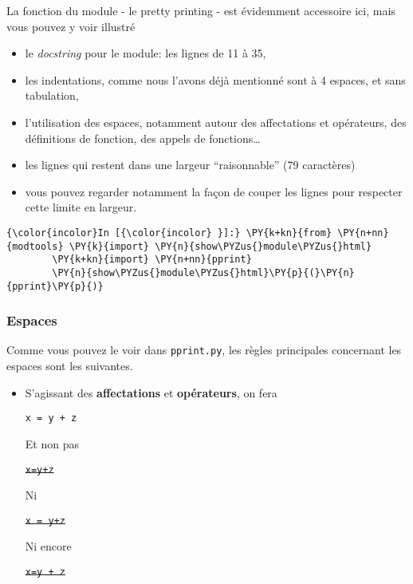 La fonction du module - le pretty printing - est évidemment accessoire
ici, mais vous pouvez y voir illustré

\begin{itemize}
	\item 
	le \emph{docstring} pour le module: les lignes de 11 à 35,
	\item
	les indentations, comme nous l'avons déjà mentionné sont à 4 espaces, et sans tabulation,
	\item
	l'utilisation des espaces, notamment autour des affectations et opérateurs, des
	définitions de fonction, des appels de fonctions\ldots{}
	\item
	les lignes qui restent dans une largeur ``raisonnable'' (79 caractères)
	\item 
	vous pouvez regarder notamment la façon de couper les lignes pour respecter cette limite en largeur.
\end{itemize}


    \begin{Verbatim}[commandchars=\\\{\}]
{\color{incolor}In [{\color{incolor} }]:} \PY{k+kn}{from} \PY{n+nn}{modtools} \PY{k}{import} \PY{n}{show\PYZus{}module\PYZus{}html}
        \PY{k+kn}{import} \PY{n+nn}{pprint}
        \PY{n}{show\PYZus{}module\PYZus{}html}\PY{p}{(}\PY{n}{pprint}\PY{p}{)}
\end{Verbatim}


    \hypertarget{espaces}{%
\subsubsection{Espaces}\label{espaces}}

    Comme vous pouvez le voir dans \texttt{pprint.py}, les règles
principales concernant les espaces sont les suivantes.

    \begin{itemize}
\item
  S'agissant des \textbf{affectations} et \textbf{opérateurs}, on fera

  \texttt{x\ =\ y\ +\ z}

  Et non pas

  \sout{\texttt{x=y+z}}

  Ni

  \sout{\texttt{x\ =\ y+z}}

  Ni encore

  \sout{\texttt{x=y\ +\ z}}
\end{itemize}

